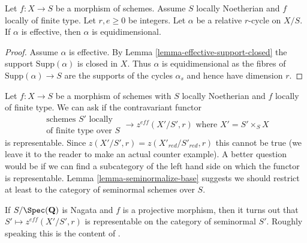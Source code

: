 \begin{lemma}
\label{lemma-effective-equidimensional}
Let $f : X \to S$ be a morphism of schemes. Assume $S$ locally Noetherian
and $f$ locally of finite type. Let $r, e \geq 0$ be integers.
Let $\alpha$ be a relative $r$-cycle on $X/S$.
If $\alpha$ is effective, then $\alpha$ is equidimensional.
\end{lemma}

\begin{proof}
Assume $\alpha$ is effective. By Lemma \ref{lemma-effective-support-closed}
the support $\text{Supp}(\alpha)$ is closed in $X$. Thus
$\alpha$ is equidimensional as the fibres of $\text{Supp}(\alpha) \to S$
are the supports of the cycles $\alpha_s$ and hence have dimension $r$.
\end{proof}

\begin{remark}
\label{remark-representable}
Let $f : X \to S$ be a morphism of schemes with $S$ locally Noetherian
and $f$ locally of finite type. We can ask if the contravariant functor
$$
\begin{matrix}
\text{schemes }S'\text{ locally} \\
\text{of finite type over }S
\end{matrix}
\longrightarrow
z^{eff}(X'/S', r)\text{ where }X' = S' \times_S X
$$
is representable. Since $z(X'/S', r) = z(X'_{red}/S'_{red}, r)$
this cannot be true (we leave it to the reader to make an actual
counter example). A better question would be if we can find a
subcategory of the left hand side on which the functor is
representable. Lemma \ref{lemma-seminormalize-base} suggests
we should restrict at least to the category of seminormal schemes over $S$.

\medskip\noindent
If $S/\Spec(\mathbf{Q})$ is Nagata and $f$ is a projective morphism, then
it turns out that $S' \mapsto z^{eff}(X'/S', r)$ is representable on the
category of seminormal $S'$. Roughly speaking this is the content of
\cite[Theorem 3.21]{KRC}.


\end{remark}
